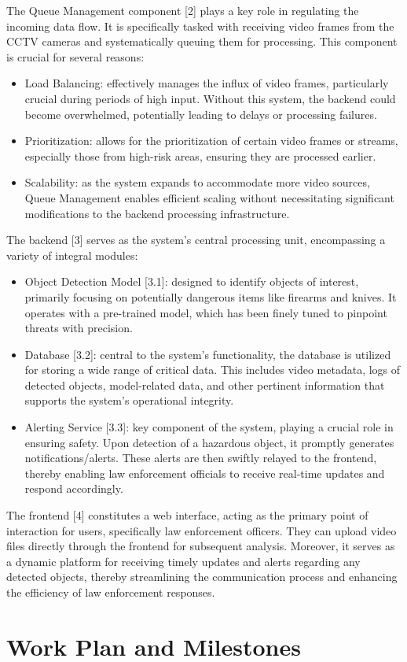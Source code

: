 The Queue Management component [2] plays a key role in regulating the incoming data flow. It is specifically tasked with receiving video frames from the CCTV cameras and systematically queuing them for processing. This component is crucial for several reasons:
\begin{itemize}
    \item Load Balancing: effectively manages the influx of video frames, particularly crucial during periods of high input. Without this system, the backend could become overwhelmed, potentially leading to delays or processing failures.
    \item Prioritization: allows for the prioritization of certain video frames or streams, especially those from high-risk areas, ensuring they are processed earlier.
    \item Scalability: as the system expands to accommodate more video sources, Queue Management enables efficient scaling without necessitating significant modifications to the backend processing infrastructure.
\end{itemize}

The backend [3] serves as the system's central processing unit, encompassing a variety of integral modules:
\begin{itemize}
    \item Object Detection Model [3.1]: designed to identify objects of interest, primarily focusing on potentially dangerous items like firearms and knives. It operates with a pre-trained model, which has been finely tuned to pinpoint threats with precision.
    \item Database [3.2]: central to the system's functionality, the database is utilized for storing a wide range of critical data. This includes video metadata, logs of detected objects, model-related data, and other pertinent information that supports the system's operational integrity.
    \item Alerting Service [3.3]: key component of the system, playing a crucial role in ensuring safety. Upon detection of a hazardous object, it promptly generates notifications/alerts. These alerts are then swiftly relayed to the frontend, thereby enabling law enforcement officials to receive real-time updates and respond accordingly.
\end{itemize}

The frontend [4] constitutes a web interface, acting as the primary point of interaction for users, specifically law enforcement officers. They can upload video files directly through the frontend for subsequent analysis. Moreover, it serves as a dynamic platform for receiving timely updates and alerts regarding any detected objects, thereby streamlining the communication process and enhancing the efficiency of law enforcement responses.

\section{Work Plan and Milestones}